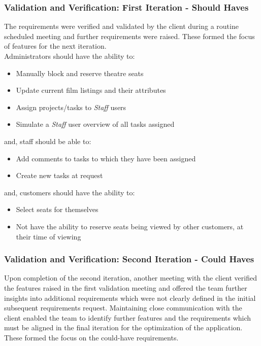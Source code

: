 \documentclass[11pt, english]{article}
\begin{document}
		\subsubsection{Validation and Verification: First Iteration - Should Haves}

	The requirements were verified and validated by the client during a routine scheduled meeting and further requirements were raised. These formed the focus of features for the next iteration.\\

	Administrators should have the ability to:

	\begin{itemize}
        \setlength\itemsep{0cm}
		\item Manually block and reserve theatre seats
		\item Update current film listings and their attributes
		\item Assign projects/tasks to \textit{Staff} users
		\item Simulate a \textit{Staff} user overview of all tasks assigned
	\end{itemize}

	and, staff should be able to:

	\begin{itemize}
        \setlength\itemsep{0cm}
		\item Add comments to tasks to which they have been assigned
		\item Create new tasks at request
	\end{itemize}

	and, customers should have the ability to:

	\begin{itemize}
        \setlength\itemsep{0cm}
		\item Select seats for themselves
		\item Not have the ability to reserve seats being viewed by other customers, at their time of viewing
	\end{itemize}

		\subsubsection{Validation and Verification: Second Iteration - Could Haves}

	Upon completion of the second iteration, another meeting with the client verified the features raised in the first validation meeting and offered the team further insights into additional requirements which were not clearly defined in the initial subsequent requirements request. Maintaining close communication with the client enabled the team to identify further features and the requirements which must be aligned in the final iteration for the optimization of the application. These formed the focus on the could-have requirements.\\
\end{document}
